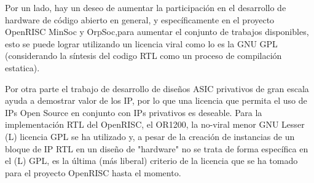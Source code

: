 \documentclass[a4paper,11pt]{article}
\begin{document}
Por un lado, hay un deseo de aumentar la participación en el desarrollo de hardware de código abierto en general, y específicamente en el proyecto OpenRISC MinSoc y OrpSoc,para aumentar el conjunto de trabajos disponibles, esto se puede lograr utilizando un licencia viral como lo es la GNU GPL (considerando la síntesis del codigo RTL como un proceso de compilación estatica). 

Por otra parte el trabajo de desarrollo de diseños ASIC privativos de gran escala ayuda a demostrar valor de los IP, por lo que una licencia que permita el uso de IPs Open Source en conjunto con  IPs privativos es deseable.
Para la implementación RTL del OpenRISC, el OR1200, la no-viral menor GNU Lesser (L) licencia GPL se ha utilizado y, a pesar de la creación de instancias de un bloque de IP RTL
en un diseño de "hardware" no se trata de forma específica en el (L) GPL, es la última
(más liberal) criterio de la licencia que se ha tomado para el proyecto OpenRISC
hasta el momento.
 
\end{document}
